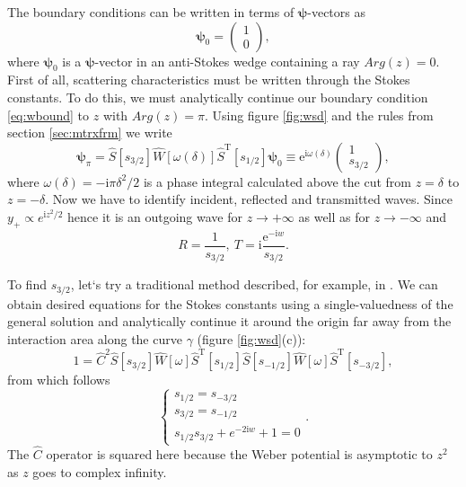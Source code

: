 \documentclass[atmp]{ipart_v1}
\def\rme{\mathrm{e}}
\def\rmi{\mathrm{i}}
\def\S{\widehat{S}}
\def\W{\widehat{W}}
\def\C{\widehat{C}}
\def\psii{\bm\psi}
\def\Tp{\mathrm{T}}
\def\unity{1}
\def\w{\omega}
\newcommand\eref[1]{\eqref{#1}}
\newcommand\fref[1]{figure \ref{#1}}
\newcommand\sref[1]{section \ref{#1}}
\begin{document}
The boundary conditions can be written in terms of $\psii$-vectors as
\begin{equation}
\psii_0 = \left(\begin{array}{*{2}{c}} 1 \\ 0 \end{array}\right),
\label{eq:wbound}
\end{equation}
where $\psii_0$ is a $\psii$-vector in an anti-Stokes wedge containing a ray $Arg(z)=0$.
First of all, scattering characteristics must be written through the 
Stokes constants. To do this, we must analytically continue our boundary 
condition \eref{eq:wbound} to $z$ with $Arg(z)=\pi$. 
Using \fref{fig:wsd} and the rules from \sref{sec:mtrxfrm} we write
\begin{equation}
\psii_{\pi} = 
\S \left[ s_{3/2} \right]
\W \left[ \w(\delta) \right] 
\S^{\Tp} \left[ s_{1/2} \right] \psii_0 \equiv 
\rme^{\rmi \w(\delta)} \left(\begin{array}{*{2}{c}} 1 \\ s_{3/2} \end{array}\right),
\end{equation}
where $\w(\delta)=-\rmi\pi\delta^2/2$ is a phase integral calculated above the cut 
from $z=\delta$ to $z=-\delta$. Now we have to identify incident, reflected and transmitted waves. 
Since $y_+ \propto e^{\rmi z^2/2}$ hence it is 
an outgoing wave for $z \rightarrow +\infty$ as well as for $z \rightarrow -\infty$ and
\begin{equation}
R = \frac{1}{s_{3/2}},\ T=\rmi\frac{\rme^{-\rmi w}}{s_{3/2}}.
\label{eq:RT}
\end{equation}

To find $s_{3/2}$, let`s try a traditional method described, for example, in \cite{frpaper, white}. 
We can obtain desired equations for the Stokes constants using a single-valuedness of the general 
solution and analytically continue it around the origin far away from the interaction area along the
curve $\gamma$ (\fref{fig:wsd}(c)):
\begin{equation}
\unity = 
\C^2
\S \left[ s_{3/2} \right]
\W \left[ \w \right] 
\S^{\Tp} \left[ s_{1/2} \right]
\S \left[ s_{-1/2} \right]
\W \left[ \w \right]
\S^{\Tp} \left[ s_{-3/2} \right],
\end{equation}
from which follows
\begin{equation}
\begin{cases}
s_{1/2} = s_{-3/2}\\
s_{3/2} = s_{-1/2}\\ 
s_{1/2}s_{3/2} + e^{-2 \rmi w} + 1 = 0
\label{eq:webtrad}
\end{cases}.
\end{equation}
The $\C$ operator is squared here because the Weber potential is asymptotic to $z^2$
as $z$ goes to complex infinity.
\end{document}
